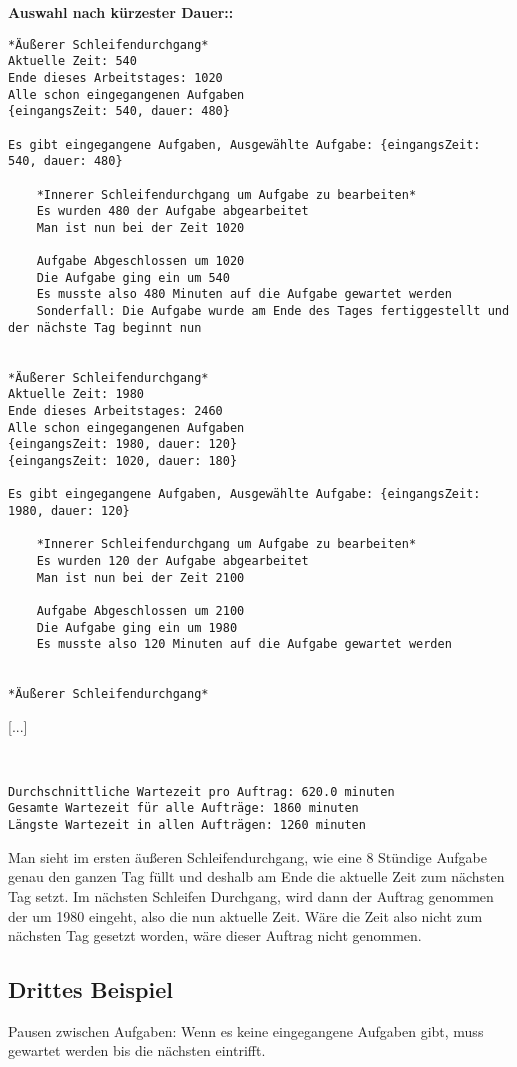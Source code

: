 \documentclass[a4paper,10pt,ngerman]{scrartcl}
\begin{document}
\textbf{ Auswahl nach kürzester Dauer::}
\begin{lstlisting}[numbers=none]
*Äußerer Schleifendurchgang*
Aktuelle Zeit: 540
Ende dieses Arbeitstages: 1020
Alle schon eingegangenen Aufgaben
{eingangsZeit: 540, dauer: 480}

Es gibt eingegangene Aufgaben, Ausgewählte Aufgabe: {eingangsZeit: 540, dauer: 480}

    *Innerer Schleifendurchgang um Aufgabe zu bearbeiten*
    Es wurden 480 der Aufgabe abgearbeitet
    Man ist nun bei der Zeit 1020

    Aufgabe Abgeschlossen um 1020
    Die Aufgabe ging ein um 540
    Es musste also 480 Minuten auf die Aufgabe gewartet werden
    Sonderfall: Die Aufgabe wurde am Ende des Tages fertiggestellt und der nächste Tag beginnt nun


*Äußerer Schleifendurchgang*
Aktuelle Zeit: 1980
Ende dieses Arbeitstages: 2460
Alle schon eingegangenen Aufgaben
{eingangsZeit: 1980, dauer: 120}
{eingangsZeit: 1020, dauer: 180}

Es gibt eingegangene Aufgaben, Ausgewählte Aufgabe: {eingangsZeit: 1980, dauer: 120}

    *Innerer Schleifendurchgang um Aufgabe zu bearbeiten*
    Es wurden 120 der Aufgabe abgearbeitet
    Man ist nun bei der Zeit 2100

    Aufgabe Abgeschlossen um 2100
    Die Aufgabe ging ein um 1980
    Es musste also 120 Minuten auf die Aufgabe gewartet werden


*Äußerer Schleifendurchgang*
\end{lstlisting}
[...]
\begin{lstlisting}[numbers=none]


Durchschnittliche Wartezeit pro Auftrag: 620.0 minuten
Gesamte Wartezeit für alle Aufträge: 1860 minuten
Längste Wartezeit in allen Aufträgen: 1260 minuten
\end{lstlisting}

Man sieht im ersten äußeren Schleifendurchgang,
wie eine 8 Stündige Aufgabe genau den ganzen Tag füllt
und deshalb am Ende die aktuelle Zeit zum nächsten Tag setzt.
Im nächsten Schleifen Durchgang,
wird dann der Auftrag genommen der um 1980 eingeht, also die nun aktuelle Zeit.
Wäre die Zeit also nicht zum nächsten Tag gesetzt worden,
wäre dieser Auftrag nicht genommen.
\newpage
\subsection{Drittes Beispiel}\label{sec:beispiel3}
Pausen zwischen Aufgaben: Wenn es keine eingegangene Aufgaben gibt,
muss gewartet werden bis die nächsten eintrifft.
\end{document}
